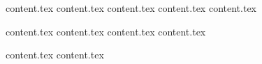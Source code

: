 \documentclass[letterpaper,11pt]{article}
\theoremstyle{mytheorem}
\begin{document}
{content.tex} \clearpage\newpage
{content.tex} \clearpage\newpage
{content.tex} \clearpage\newpage
{content.tex} \clearpage\newpage
{content.tex} \clearpage\newpage

{content.tex} \clearpage\newpage
{content.tex} \clearpage\newpage
{content.tex} \clearpage\newpage
{content.tex} \clearpage\newpage

{content.tex} \clearpage\newpage
{content.tex} \clearpage\newpage
\end{document}
